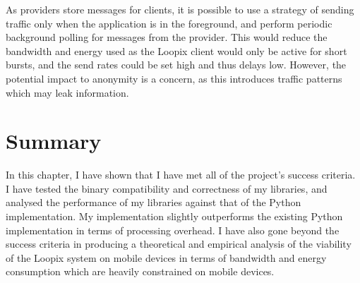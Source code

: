 \documentclass[final,dissertation.tex]{subfiles}
\begin{document}
As providers store messages for clients, it is possible to use a strategy of sending traffic only when the application is in the foreground, and perform periodic background polling for messages from the provider. This would reduce the bandwidth and energy used as the Loopix client would only be active for short bursts, and the send rates could be set high and thus delays low. However, the potential impact to anonymity is a concern, as this introduces traffic patterns which may leak information.

\section{Summary}

In this chapter, I have shown that I have met all of the project's success criteria. I have tested the binary compatibility and correctness of my libraries, and analysed the performance of my libraries against that of the Python implementation. My implementation slightly outperforms the existing Python implementation in terms of processing overhead. I have also gone beyond the success criteria in producing a theoretical and empirical analysis of the viability of the Loopix system on mobile devices in terms of bandwidth and energy consumption which are heavily constrained on mobile devices.
\end{document}
